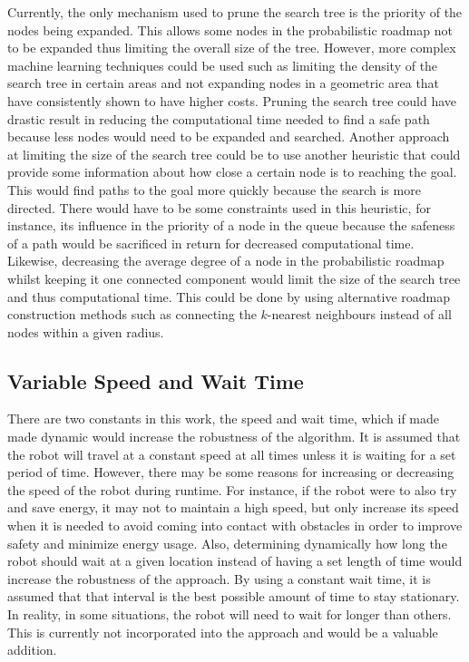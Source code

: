 Currently, the only mechanism used to prune the search tree is the priority of
the nodes being expanded. This allows some nodes in the probabilistic roadmap
not to be expanded thus limiting the overall size of the tree. However, more
complex machine learning techniques could be used such as limiting the density
of the search tree in certain areas and not expanding nodes in a geometric area
that have consistently shown to have higher costs. Pruning the search tree
could have drastic result in reducing the computational time needed to find a
safe path because less nodes would need to be expanded and searched. Another
approach at limiting the size of the search tree could be to use another
heuristic that could provide some information about how close a certain node is
to reaching the goal. This would find paths to the goal more quickly because
the search is more directed. There would have to be some constraints used in
this heuristic, for instance, its influence in the priority of a node in the
queue because the safeness of a path would be sacrificed in return for
decreased computational time. Likewise, decreasing the average degree of a node
in the probabilistic roadmap whilst keeping it one connected component would
limit the size of the search tree and thus computational time. This could be
done by using alternative roadmap construction methods such as connecting the
$k$-nearest neighbours instead of all nodes within a given radius.

\subsection{Variable Speed and Wait Time}

There are two constants in this work, the speed and wait time, which if made
made dynamic would increase the robustness of the algorithm. It is assumed that
the robot will travel at a constant speed at all times unless it is waiting for
a set period of time. However, there may be some reasons for increasing or
decreasing the speed of the robot during runtime. For instance, if the robot
were to also try and save energy, it may not to maintain a high speed, but only
increase its speed when it is needed to avoid coming into contact with
obstacles in order to improve safety and minimize energy usage. Also,
determining dynamically how long the robot should wait at a given location
instead of having a set length of time would increase the robustness of the
approach. By using a constant wait time, it is assumed that that interval is
the best possible amount of time to stay stationary. In reality, in some
situations, the robot will need to wait for longer than others. This is
currently not incorporated into the approach and would be a valuable addition.

